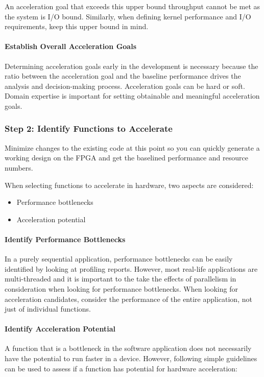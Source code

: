\par An acceleration goal that exceeds this upper bound throughput cannot be met as the system is I/O bound. Similarly, when defining kernel performance and I/O requirements, keep this upper bound in mind.

\paragraph{Establish Overall Acceleration Goals}
Determining acceleration goals early in the development is necessary because the ratio between the acceleration goal and the baseline performance drives the analysis and decision-making process. Acceleration goals can be hard or soft. Domain expertise is important for setting obtainable and meaningful acceleration goals.


\subsubsection{Step 2: Identify Functions to Accelerate}

\begin{highlight}
    Minimize changes to the existing code at this point so you can quickly generate a working design on the FPGA and get the baselined performance and resource numbers.
\end{highlight}

When selecting functions to accelerate in hardware, two aspects are considered:
\begin{itemize}
    \item Performance bottlenecks
    \item Acceleration potential
\end{itemize}

\paragraph{Identify Performance Bottlenecks}
In a purely sequential application, performance bottlenecks can be easily identified by looking at profiling reports. However, most real-life applications are multi-threaded and it is important to the take the effects of parallelism in consideration when looking for performance bottlenecks. When looking for acceleration candidates, consider the performance of the entire application, not just of individual functions.

\paragraph{Identify Acceleration Potential}
A function that is a bottleneck in the software application does not necessarily have the potential to run faster in a device. However, following simple guidelines can be used to assess if a function has potential for hardware acceleration:

